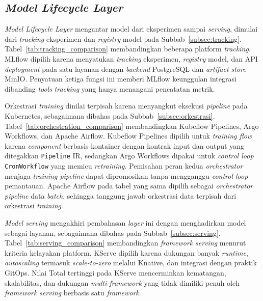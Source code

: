 

\subsection{\textit{Model Lifecycle Layer}}
\label{subsec:pilih-model}

\textit{Model Lifecycle Layer} mengantar model dari eksperimen sampai \textit{serving}, dimulai dari \textit{tracking} eksperimen dan \textit{registry} model pada Subbab~\ref{subsec:tracking}. Tabel~\ref{tab:tracking_comparison} membandingkan beberapa platform \textit{tracking}. MLflow dipilih karena menyatukan \textit{tracking} eksperimen, \textit{registry} model, dan API \textit{deployment} pada satu layanan dengan \textit{backend} PostgreSQL dan \textit{artifact store} MinIO. Penyatuan ketiga fungsi ini memberi MLflow keunggulan integrasi dibanding \textit{tools} \textit{tracking} yang hanya menangani pencatatan metrik.



Orkestrasi \textit{training} dinilai terpisah karena menyangkut eksekusi \textit{pipeline} pada Kubernetes, sebagaimana dibahas pada Subbab~\ref{subsec:orkestrasi}. Tabel~\ref{tab:orchestration_comparison} membandingkan Kubeflow Pipelines, Argo Workflows, dan Apache Airflow. Kubeflow Pipelines dipilih untuk \textit{training flow} karena \textit{component} berbasis kontainer dengan kontrak input dan output yang ditegakkan \texttt{Pipeline} IR, sedangkan Argo Workflows dipakai untuk \textit{control loop} \texttt{CronWorkflow} yang memicu \textit{retraining}. Pemisahan peran kedua \textit{orchestrator} menjaga \textit{training pipeline} dapat dipromosikan tanpa mengganggu \textit{control loop} pemantauan. Apache Airflow pada tabel yang sama dipilih sebagai \textit{orchestrator} \textit{pipeline} data \textit{batch}, sehingga tanggung jawab orkestrasi data terpisah dari orkestrasi \textit{training}.



\textit{Model serving} mengakhiri pembahasan \textit{layer} ini dengan menghadirkan model sebagai layanan, sebagaimana dibahas pada Subbab~\ref{subsec:serving}. Tabel~\ref{tab:serving_comparison} membandingkan \textit{framework} \textit{serving} menurut kriteria kelayakan platform. KServe dipilih karena dukungan banyak \textit{runtime}, \textit{autoscaling} termasuk \textit{scale-to-zero} melalui Knative, dan integrasi dengan praktik GitOps. Nilai Total tertinggi pada KServe mencerminkan kematangan, skalabilitas, dan dukungan \textit{multi-framework} yang tidak dimiliki penuh oleh \textit{framework} \textit{serving} berbasis satu \textit{framework}.

